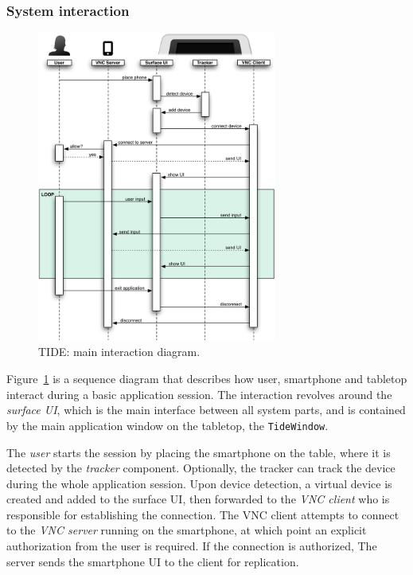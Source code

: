 \subsubsection{System interaction}

\begin{figure}[htb]
  \centering
    \includegraphics[width=0.7\textwidth]{images/sequenceOverview}
    \caption{TIDE: main interaction diagram.}
    \label{fig:sequenceOverview}
\end{figure}

Figure~\ref{fig:sequenceOverview} is a sequence diagram that describes how user, smartphone and tabletop interact during a basic application session.
The interaction revolves around the \emph{surface UI}, which is the main  interface between all system parts, and is contained by the main application window on the tabletop, the \texttt{TideWindow}.

The \emph{user} starts the session by placing the smartphone on the table, where it is detected by the \emph{tracker} component.
Optionally, the tracker can track the device during the whole application session.
Upon device detection, a virtual device is created and added to the surface UI, then forwarded to the \emph{VNC client} who is responsible for establishing the connection.
The VNC client attempts to connect to the \emph{VNC server} running on the smartphone, at which point an explicit authorization from the user is required.
If the connection is authorized, The server sends the smartphone UI to the client for replication.

